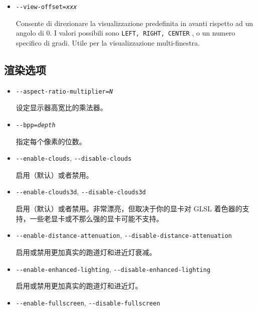 \begin{itemize}
{\begin{itemize}
  \item{\texttt{-$ $-view-offset={\it xxx}}}

  Consente di direzionare la visualizzazione predefinita in avanti
  rispetto ad un angolo di 0. I valori possibili sono \texttt{LEFT, RIGHT, CENTER}
  , o un numero specifico di gradi. Utile per la visualizzazione multi-finestra.

  \end{itemize}

}

\ifchinese
{
  \subsection{渲染选项}
 \begin{itemize}

  \item{\texttt{-$ $-aspect-ratio-multiplier={\it N}}}

    设定显示器高宽比的乘法器。

\item{\texttt{-$ $-bpp={\it depth}}}

   指定每个像素的位数。

 \item{\texttt{-$ $-enable-clouds}, \texttt{-$ $-disable-clouds}}

   启用（默认）或者禁用。

\item{\texttt{-$ $-enable-clouds3d}, \texttt{-$ $-disable-clouds3d}}

  启用（默认）或者禁用。非常漂亮，但取决于你的显卡对 GLSL 着色器的支持，一些老显卡或不那么强的显卡可能不支持。

\item{\texttt{-$ $-enable-distance-attenuation}, \texttt{-$ $-disable-distance-attenuation}}

  启用或禁用更加真实的跑道灯和进近灯衰减。

\item{\texttt{-$ $-enable-enhanced-lighting}, \texttt{-$ $-disable-enhanced-lighting}}

  启用或禁用更加真实的跑道灯和进近灯。

 \item{\texttt{-$ $-enable-fullscreen}, \texttt{-$ $-disable-fullscreen}}


\end{itemize}}
\end{itemize}
